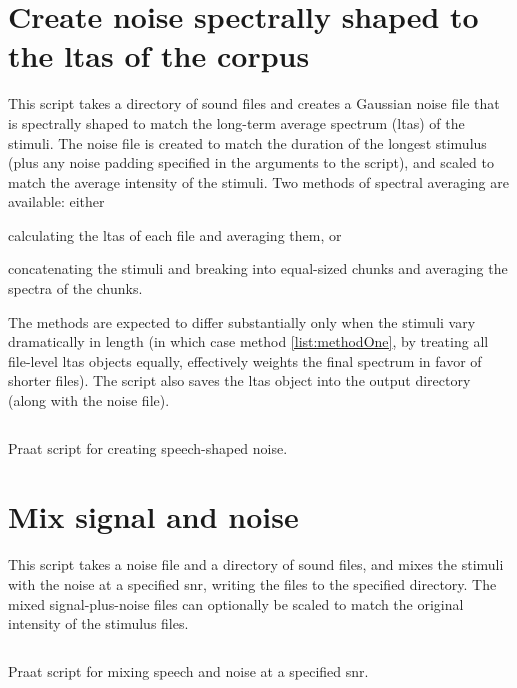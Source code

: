 \section[Create speech-shaped noise]{Create noise spectrally shaped to the \ac{ltas} of the corpus}
This script takes a directory of sound files and creates a Gaussian noise file that is spectrally shaped to match the long-term average spectrum (\ac{ltas}) of the stimuli.  The noise file is created to match the duration of the longest stimulus (plus any noise padding specified in the arguments to the script), and scaled to match the average intensity of the stimuli.  Two methods of spectral averaging are available: either
\begin{inparaenum}
\item calculating the \ac{ltas} of each file and averaging them, or \label{list:methodOne} 
\item concatenating the stimuli and breaking into equal-sized chunks and averaging the spectra of the chunks.  
\end{inparaenum}
The methods are expected to differ substantially only when the stimuli vary dramatically in length (in which case method \ref{list:methodOne}, by treating all file-level \ac{ltas} objects equally, effectively weights the final spectrum in favor of shorter files).  The script also saves the \ac{ltas} object into the output directory (along with the noise file).
 \begin{code}
	\inputminted[fontsize=\footnotesize, tabsize=2]{r}{../scripts/LTASNoise_DissVersion.praat}
	\caption[Create speech-shaped noise]{Praat script for creating speech-shaped noise.\label{lst:LTASNoise}}
\end{code}
\newpage

\section{Mix signal and noise}
This script takes a noise file and a directory of sound files, and mixes the stimuli with the noise at a specified \ac{snr}, writing the files to the specified directory.  The mixed signal-plus-noise files can optionally be scaled to match the original intensity of the stimulus files. 
\begin{code}
	\inputminted[fontsize=\footnotesize, tabsize=2]{r}{../scripts/MixSpeechNoise_DissVersion.praat}
	\caption[Mix signal and noise]{Praat script for mixing speech and noise at a specified \ac{snr}.\label{lst:MixNoise}}
\end{code}
\newpage

